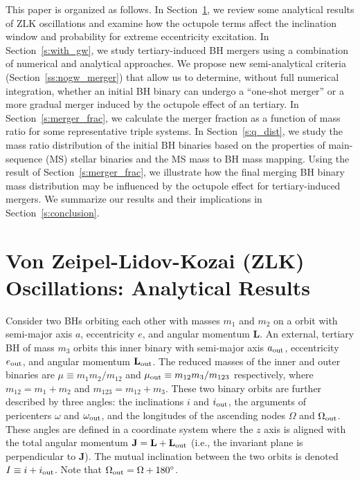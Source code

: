 \documentclass[
        fleqn,
        usenatbib,
    ]{mnras}
\newcommand*{\bm}[1]{\mathbf{#1}}
\begin{document}
This paper is organized as follows. In Section~\ref{s:background}, we review
some analytical results of ZLK oscillations and examine how the octupole terms
affect the inclination window and probability for extreme eccentricity
excitation. In Section~\ref{s:with_gw}, we study tertiary-induced BH mergers
using a combination of numerical and analytical approaches. We propose new
semi-analytical criteria (Section~\ref{ss:nogw_merger}) that
allow us to determine, without full numerical integration, whether an initial BH
binary can undergo a ``one-shot merger'' or a more gradual merger induced by the
octupole effect of an tertiary. In Section~\ref{s:merger_frac}, we calculate the
merger fraction as a function of mass ratio for some representative triple
systems. In Section~\ref{s:q_dist}, we study the mass ratio distribution of the
initial BH binaries based on the properties of main-sequence (MS) stellar
binaries and the MS mass to BH mass mapping. Using the result of
Section~\ref{s:merger_frac}, we illustrate how the final merging BH binary mass
distribution may be influenced by the octupole effect for tertiary-induced
mergers. We summarize our results and their implications in
Section~\ref{s:conclusion}.

\section{Von Zeipel-Lidov-Kozai (ZLK) Oscillations: Analytical
Results}\label{s:background}

Consider two BHs orbiting each other with masses $m_1$ and $m_2$ on a orbit with
semi-major axis $a$, eccentricity $e$, and angular momentum $\bm{L}$. An external,
tertiary BH of mass $m_3$ orbits this inner binary with semi-major axis $a_{\rm
out}$, eccentricity $e_{\rm out}$, and angular momentum $\bm{L}_{\rm out}$. The
reduced masses of the inner and outer binaries are $\mu \equiv m_1m_2 / m_{12}$
and $\mu_{\rm out} \equiv m_{12} m_3 / m_{123}$ respectively, where $m_{12} =
m_1 + m_2$ and $m_{123} = m_{12} + m_3$. These two binary orbits are further
described by three angles: the inclinations $i$ and $i_{\rm out}$, the arguments
of pericenters $\omega$ and $\omega_{\rm out}$, and the longitudes of the
ascending nodes $\Omega$ and $\Omega_{\rm out}$. These angles are defined in a
coordinate system where the $z$ axis is aligned with the total angular momentum
$\bm{J} = \bm{L} + \bm{L}_{\rm out}$ (i.e., the invariant plane is perpendicular
to $\bm{J}$). The mutual inclination between the two orbits is denoted $I \equiv
i + i_{\rm out}$. Note that $\Omega_{\rm out} = \Omega + 180^\circ$.
\end{document}
